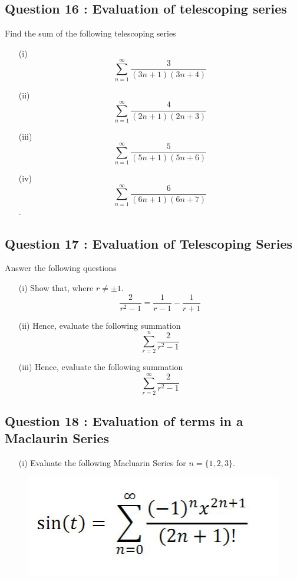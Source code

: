 \documentclass[]{article}
\begin{document}
\newpage



\subsection*{Question 16 : Evaluation of telescoping series}

Find the sum of the following telescoping series
\begin{multicols}{2}
	\begin{itemize}
		\item[(i)]
		\[  \sum^{\infty}_{n=1}   \frac{3}{(3n+1)(3n+4)}  \]
		
		\item[(ii)]
		\[  \sum^{\infty}_{n=1}   \frac{4}{(2n+1)(2n+3)}  \]
		
		\item[(iii)]
		\[  \sum^{\infty}_{n=1}   \frac{5}{(5n+1)(5n+6)}  \]
		
		\item[(iv)]
		\[  \sum^{\infty}_{n=1}  \frac{6}{(6n+1)(6n+7)}  \]
		.
	\end{itemize}
\end{multicols}

\bigskip
\subsection*{Question 17 : Evaluation of Telescoping Series}
Answer the following questions
\begin{itemize}
	\item[(i)] Show that, where $r \neq \pm 1$.
	\[ \frac{2}{r^2-1} =  \frac{1}{r-1} - \frac{1}{r+1} \]
	
	\item[(ii)] Hence, evaluate the following summation
	\[  \sum^{n}_{r=2} \frac{2}{r^2-1} \]
	\item[(iii)] Hence, evaluate the following summation
	\[  \sum^{\infty}_{r=2} \frac{2}{r^2-1} \]
\end{itemize}

\subsection*{Question 18 : Evaluation of terms in a Maclaurin Series}
\large
\begin{itemize}
	\item[(i)] Evaluate the following Macluarin Series for $n=\{1,2,3\}$.
\end{itemize}
\begin{figure}[h!]
	\centering
	\includegraphics[width=0.30\linewidth]{macl3}
	\label{fig:macl3}
\end{figure}
\end{document}
